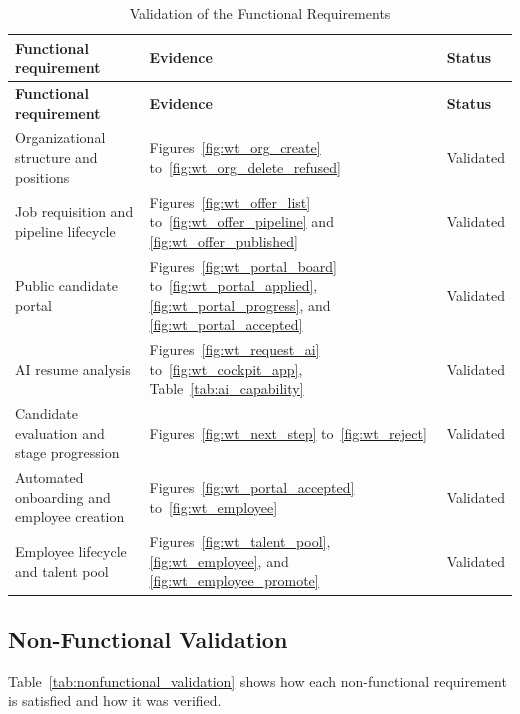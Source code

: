 \begingroup
\linespread{1}\selectfont
\renewcommand{\arraystretch}{1.4}
\begin{longtable}{@{}F{5.6cm}F{8.4cm}F{3.5cm}@{}}
\caption{Validation of the Functional Requirements}\label{tab:functional_validation}\\
\toprule
\textbf{Functional requirement} & \textbf{Evidence} & \textbf{Status} \\
\midrule
\endfirsthead
\toprule
\textbf{Functional requirement} & \textbf{Evidence} & \textbf{Status} \\
\midrule
\endhead
\bottomrule
\endlastfoot
Organizational structure and positions & Figures~\ref{fig:wt_org_create} to~\ref{fig:wt_org_delete_refused} & Validated \\
Job requisition and pipeline lifecycle & Figures~\ref{fig:wt_offer_list} to~\ref{fig:wt_offer_pipeline} and \ref{fig:wt_offer_published} & Validated \\
Public candidate portal & Figures~\ref{fig:wt_portal_board} to~\ref{fig:wt_portal_applied}, \ref{fig:wt_portal_progress}, and \ref{fig:wt_portal_accepted} & Validated \\
AI resume analysis & Figures~\ref{fig:wt_request_ai} to~\ref{fig:wt_cockpit_app}, Table~\ref{tab:ai_capability} & Validated \\
Candidate evaluation and stage progression & Figures~\ref{fig:wt_next_step} to~\ref{fig:wt_reject} & Validated \\
Automated onboarding and employee creation & Figures~\ref{fig:wt_portal_accepted} to~\ref{fig:wt_employee} & Validated \\
Employee lifecycle and talent pool & Figures~\ref{fig:wt_talent_pool}, \ref{fig:wt_employee}, and \ref{fig:wt_employee_promote} & Validated \\
\end{longtable}
\endgroup

\subsection{Non-Functional Validation}
\label{subsec:nonfunctional_validation}

Table~\ref{tab:nonfunctional_validation} shows how each non-functional requirement is satisfied and how it was verified.

